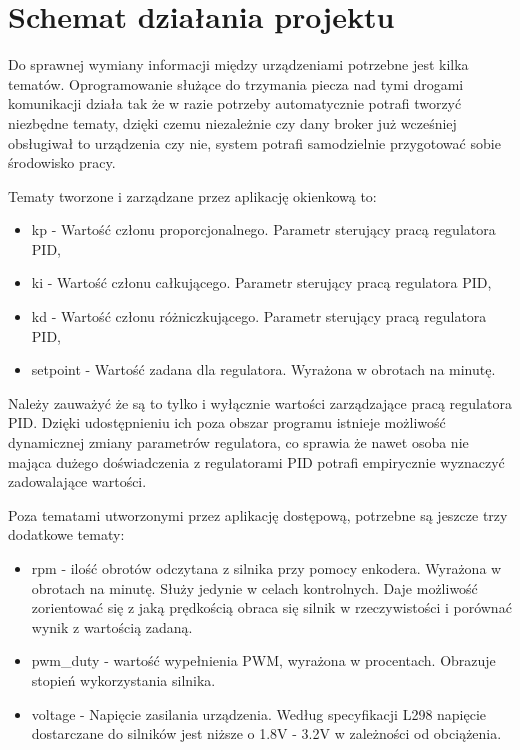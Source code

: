 
  \chapter{Schemat działania projektu}
    Do sprawnej wymiany informacji między urządzeniami potrzebne jest kilka tematów. Oprogramowanie służące do trzymania piecza nad tymi drogami komunikacji działa tak że w razie potrzeby automatycznie potrafi tworzyć niezbędne tematy, dzięki czemu niezależnie czy dany broker już wcześniej obsługiwał to urządzenia czy nie, system potrafi samodzielnie przygotować sobie środowisko pracy.
    
    \vspace{1em} 
    Tematy tworzone i zarządzane przez aplikację okienkową to:

    \begin{itemize}
      \item kp - Wartość członu proporcjonalnego. Parametr sterujący pracą regulatora PID,
      \item ki - Wartość członu całkującego. Parametr sterujący pracą regulatora PID,
      \item kd - Wartość członu różniczkującego. Parametr sterujący pracą regulatora PID, 
      \item setpoint - Wartość zadana dla regulatora. Wyrażona w obrotach na minutę. 
    \end{itemize}

    Należy zauważyć że są to tylko i wyłącznie wartości zarządzające pracą regulatora PID. Dzięki udostępnieniu ich poza obszar programu istnieje możliwość dynamicznej zmiany parametrów regulatora, co sprawia że nawet osoba nie mająca dużego doświadczenia z regulatorami PID potrafi empirycznie wyznaczyć zadowalające wartości. 
    
    \vspace{1em} 
    Poza tematami utworzonymi przez aplikację dostępową, potrzebne są jeszcze trzy dodatkowe tematy:

    \begin{itemize}
      \item rpm - ilość obrotów odczytana z silnika przy pomocy enkodera. Wyrażona w obrotach na minutę. Służy jedynie w celach kontrolnych. Daje możliwość zorientować się z jaką prędkością obraca się silnik w rzeczywistości i porównać wynik z wartością zadaną.
      \item pwm\_duty - wartość wypełnienia PWM, wyrażona w procentach. Obrazuje stopień wykorzystania silnika.
      \item voltage - Napięcie zasilania urządzenia. Według specyfikacji L298 napięcie dostarczane do silników jest niższe o 1.8V - 3.2V w zależności od obciążenia. \cite{mostek}
    \end{itemize}
    
